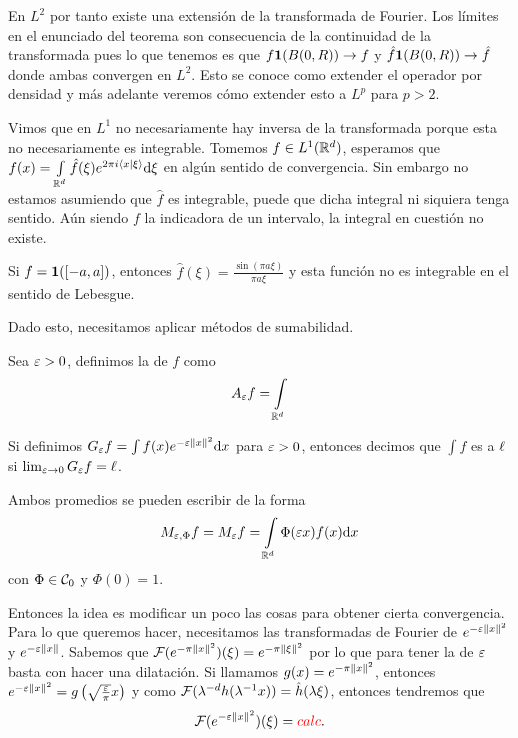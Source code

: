 \documentclass[12pt]{memoir}
\begin{document}
En $L^2$ por tanto existe una extensión de la transformada de Fourier. Los límites en el enunciado del teorema son consecuencia de la continuidad de la transformada pues lo que tenemos es que $f\mathbf{1}(B(0,R))\to f$ y $\hat f\mathbf{1}(B(0,R))\to \hat f$ donde ambas convergen en $L^2$. Esto se conoce como extender el operador por densidad y más adelante veremos cómo extender esto a $L^p$ para $p>2$.

Vimos que en $L^1$ no necesariamente hay inversa de la transformada porque esta no necesariamente es integrable. Tomemos $f\in L^1(\mathbb{R}^d)$, esperamos que $f(x)=\int\limits_{\mathbb{R}^d}\hat{f}(\xi)e^{2\pi i\braket{x}{\xi}}\dd\xi$ en algún sentido de convergencia. Sin embargo no estamos asumiendo que $\hat{f}$ es integrable, puede que dicha integral ni siquiera tenga sentido. Aún siendo $f$ la indicadora de un intervalo, la integral en cuestión no existe.

\begin{Ex}
  Si $f=\mathbf{1}([-a,a])$, entonces $\hat{f}(\xi)=\frac{\sin(\pi a\xi)}{\pi a\xi}$ y esta función no es integrable en el sentido de Lebesgue.
\end{Ex}

Dado esto, necesitamos aplicar métodos de sumabilidad. 

\begin{Def}
  Sea $\varepsilon>0$, definimos la  de $f$ como 
  $$A_\varepsilon f=\int\limits_{\mathbb{R}^d}$$
\end{Def}

\begin{Def}
  Si definimos $G_\varepsilon f=\int f(x)e^{-\varepsilon\left\|x\right\|^2}\dd x$ para $\varepsilon>0$, entonces decimos que $\int f$ es  a $\ell$ si $\lim_{\varepsilon\to 0}G_\varepsilon f=\ell$.
\end{Def}

Ambos promedios se pueden escribir de la forma
$$M_{\varepsilon,\Phi}f=M_\varepsilon f=\int\limits_{\mathbb{R}^d}\Phi(\varepsilon x)f(x)\dd x$$
con $\Phi\in\mathcal{C}_0$ y $\Phi(0)=1$.

Entonces la idea es modificar un poco las cosas para obtener cierta convergencia. Para lo que queremos hacer, necesitamos las transformadas de Fourier de $e^{-\varepsilon\left\|x\right\|^2}$ y $e^{-\varepsilon\left\|x\right\|}$. Sabemos que $\mathcal{F}(e^{-\pi\left\|x\right\|^2})(\xi)=e^{-\pi\left\|\xi\right\|^2}$ por lo que para tener la de $\varepsilon$ basta con hacer una dilatación. Si llamamos $g(x)=e^{-\pi\left\|x\right\|^2}$, entonces $e^{-\varepsilon\left\|x\right\|^2}=g\left(\sqrt{\frac{\varepsilon}{\pi}}x\right)$ y como $\mathcal{F}(\lambda^{-d}h(\lambda^{-1}x))=\hat{h}(\lambda\xi)$, entonces tendremos que 
$$\mathcal{F}(e^{-\varepsilon\left\|x\right\|^2})(\xi)=\textcolor{red}{calc}.$$
\end{document}

